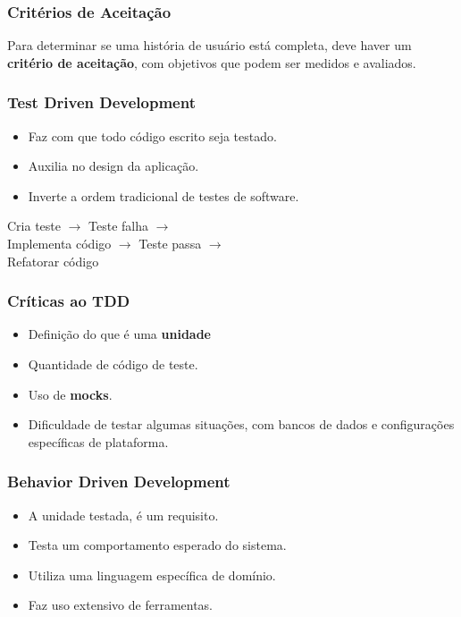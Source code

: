 \begin{frame}
    \frametitle{Critérios de Aceitação}
    Para determinar se uma história de usuário está completa,
    deve haver um \textbf{critério de aceitação}, com objetivos
    que podem ser medidos e avaliados.
\end{frame}

\begin{frame}
    \frametitle{Test Driven Development}
    \begin{itemize}
        \item Faz com que todo código escrito seja testado.
        \item Auxilia no design da aplicação.
        \item Inverte a ordem tradicional de testes de software.
    \end{itemize}
    \color{blue}
    \hspace{1cm}Cria teste $\rightarrow$ Teste falha $\rightarrow$\\
    \hspace{3cm}Implementa código $\rightarrow$ Teste passa $\rightarrow$\\
    \hspace{6cm}Refatorar código
    
\end{frame}

\begin{frame}
    \frametitle{Críticas ao TDD}
    \begin{itemize}[label=]
        \item Definição do que é uma \textbf{unidade}
        \item Quantidade de código de teste.
        \item Uso de \textbf{mocks}.
        \item Dificuldade de testar algumas situações, com bancos de dados
        e configurações específicas de plataforma.
    \end{itemize}
\end{frame}

\begin{frame}
    \frametitle{Behavior Driven Development}
    \begin{itemize}
        \item A unidade testada, é um requisito.
        \item Testa um comportamento esperado do sistema.
        \item Utiliza uma linguagem específica de domínio.
        \item Faz uso extensivo de ferramentas.
    \end{itemize}
\end{frame}

